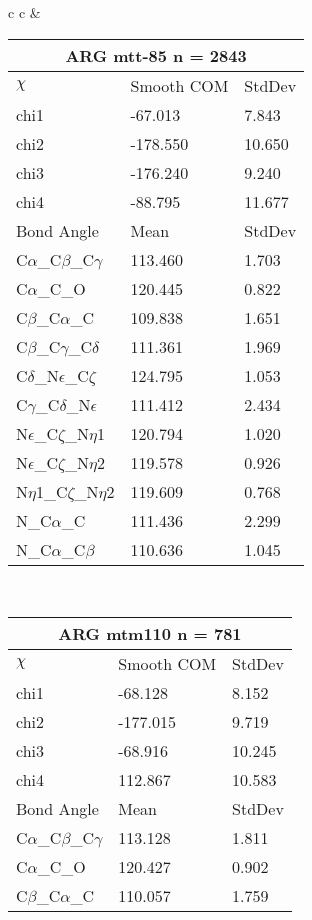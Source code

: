\begin{longtable}{ c c }
  &
  \begin{tabular}{ l l l }
  \toprule
  \multicolumn{3}{c}{ARG \textbf{mtt-85} n = 2843} \\ \toprule
  $\chi$       & Smooth COM & StdDev \\ \midrule
  chi1 & -67.013 & 7.843 \\ 
  chi2 & -178.550 & 10.650 \\ 
  chi3 & -176.240 & 9.240 \\ 
  chi4 & -88.795 & 11.677 \\ \midrule
  Bond Angle   & Mean     & StdDev \\ \midrule
  C$\alpha$\_C$\beta$\_C$\gamma$ & 113.460 & 1.703\\
  C$\alpha$\_C\_O & 120.445 & 0.822\\
  C$\beta$\_C$\alpha$\_C & 109.838 & 1.651\\
  C$\beta$\_C$\gamma$\_C$\delta$ & 111.361 & 1.969\\
  C$\delta$\_N$\epsilon$\_C$\zeta$ & 124.795 & 1.053\\
  C$\gamma$\_C$\delta$\_N$\epsilon$ & 111.412 & 2.434\\
  N$\epsilon$\_C$\zeta$\_N$\eta$1 & 120.794 & 1.020\\
  N$\epsilon$\_C$\zeta$\_N$\eta$2 & 119.578 & 0.926\\
  N$\eta$1\_C$\zeta$\_N$\eta$2 & 119.609 & 0.768\\
  N\_C$\alpha$\_C & 111.436 & 2.299\\
  N\_C$\alpha$\_C$\beta$ & 110.636 & 1.045\\
  \bottomrule
  \end{tabular}
  \\
  \begin{tabular}{ l l l }
  \toprule
  \multicolumn{3}{c}{ARG \textbf{mtm110} n = 781} \\ \toprule
  $\chi$       & Smooth COM & StdDev \\ \midrule
  chi1 & -68.128 & 8.152 \\ 
  chi2 & -177.015 & 9.719 \\ 
  chi3 & -68.916 & 10.245 \\ 
  chi4 & 112.867 & 10.583 \\ \midrule
  Bond Angle   & Mean     & StdDev \\ \midrule
  C$\alpha$\_C$\beta$\_C$\gamma$ & 113.128 & 1.811\\
  C$\alpha$\_C\_O & 120.427 & 0.902\\
  C$\beta$\_C$\alpha$\_C & 110.057 & 1.759\\

\end{tabular}
\end{longtable}
